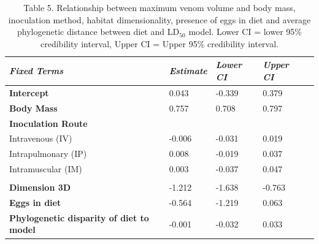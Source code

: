 \begin{table}[H]
  \centering
    \caption*{Table 5. Relationship between maximum venom volume and body mass, inoculation method, habitat dimensionality, presence of eggs in diet and average phylogenetic distance between diet and LD$_{50}$ model. Lower CI = lower 95\% credibility interval, Upper CI = Upper 95\% credibility interval. }
\begin{tabular}{*5l}    \toprule
\emph{Fixed Terms} & \emph{Estimate} & \emph{Lower CI} & \emph{Upper CI}\\\midrule
\textbf{Intercept} & 0.043  &  -0.339 & 0.379 \\ 
\textbf{Body Mass} & 0.757  & 0.708 & 0.797 \\ 
\textbf{Inoculation Route} &  &  &  \\ 
 Intravenous (IV) &  -0.006 &  -0.031 & 0.019 \\
 Intrapulmonary (IP) & 0.008 &  -0.019 & 0.037 \\ 
 Intramuscular (IM) & 0.003 &  -0.037 & 0.047 \\
  &  &  &  \\ 
\textbf{Dimension 3D} &  -1.212 &  -1.638 &  -0.763 \\ 
\textbf{Eggs in diet} &  -0.564 &  -1.219 & 0.063 \\ 
\textbf{Phylogenetic disparity of diet to model} &  -0.001 &  -0.032 & 0.033 \\\bottomrule
 \hline
\end{tabular}
  \label{tbl:Table 5.}
\end{table}



